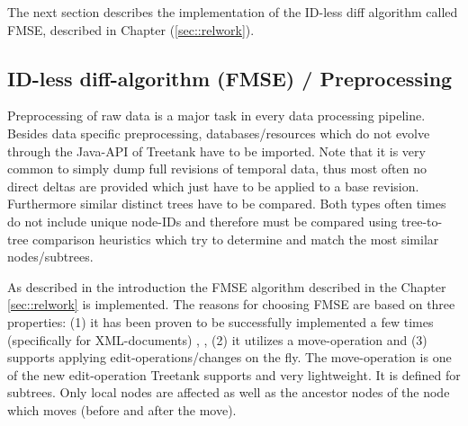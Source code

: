 
The next section describes the implementation of the ID-less diff algorithm called FMSE, described in Chapter (\ref{sec::relwork}).

\subsection{ID-less diff-algorithm (FMSE) / Preprocessing}
Preprocessing of raw data is a major task in every data processing pipeline. Besides data specific preprocessing, databases/resources which do not evolve through the Java-API of Treetank have to be imported. Note that it is very common to simply dump full revisions of temporal data, thus most often no direct deltas are provided which just have to be applied to a base revision. Furthermore similar distinct trees have to be compared. Both types often times do not include unique node-IDs and therefore must be compared using tree-to-tree comparison heuristics which try to determine and match the most similar nodes/subtrees. %

As described in the introduction the FMSE algorithm described in the Chapter \ref{sec::relwork} is implemented. The reasons for choosing FMSE are based on three properties: (1) it has been proven to be successfully implemented a few times (specifically for XML-documents) \cite{xmldiff}, \cite{diffxml}, (2) it utilizes a move-operation and (3) supports applying edit-operations/changes on the fly. The move-operation is one of the new edit-operation Treetank supports and very lightweight. It is defined for subtrees. Only local nodes are affected as well as the ancestor nodes of the node which moves (before and after the move). 

